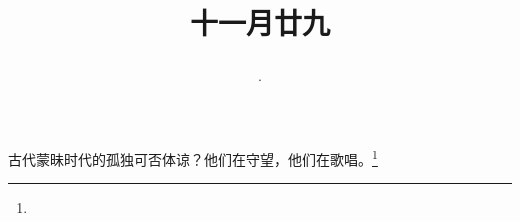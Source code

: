\title{\date[d=29,m=12,y=2024][year:cn-y,年,month:cn,day:cn,日,·,weekday]·十一月廿九 }
古代蒙昧时代的孤独可否体谅？他们在守望，他们在歌唱。\footnote{ }

